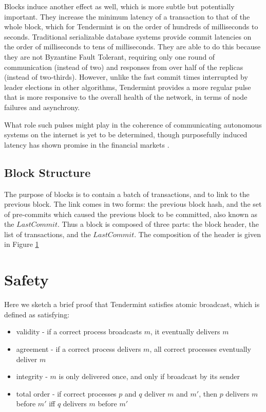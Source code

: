 Blocks induce another effect as well, which is more subtle but potentially important. 
They increase the minimum latency of a transaction to that of the whole block, 
which for Tendermint is on the order of hundreds of milliseconds to seconds.
Traditional serializable database systems provide commit latencies on the 
order of milliseconds to tens of milliseconds.
They are able to do this because they are not Byzantine Fault Tolerant, 
requiring only one round of communication (instead of two)
and responses from over half of the replicas (instead of two-thirds).
However, unlike the fast commit times interrupted by leader elections in other algorithms,
Tendermint provides a more regular pulse that is more responsive to the overall health of the network, 
in terms of node failures and asynchrony.

What role such pulses might play in the coherence of 
communicating autonomous systems on the internet is yet to be determined,
though purposefully induced latency has shown promise in the financial markets \cite{ryan2015beyond}.

\subsection{Block Structure}

The purpose of blocks is to contain a batch of transactions, and to link to the previous block.
The link comes in two forms: the previous block hash,
and the set of pre-commits which caused the previous block to be committed, also known as the $LastCommit$.
Thus a block is composed of three parts: the block header, the list of transactions, and the $LastCommit$.
The composition of the header is given in Figure \ref{fig:header}

\begin{figure}[]
	
	\label{fig:header}
\end{figure}

\section{Safety}

Here we sketch a brief proof that Tendermint satisfies atomic broadcast,
which is defined as satisfying:

\begin{itemize}
\item validity - if a correct process broadcasts $m$, it eventually delivers $m$
\item agreement - if a correct process delivers $m$, all correct processes eventually deliver $m$
\item integrity - $m$ is only delivered once, and only if broadcast by its sender
\item total order - if correct processes $p$ and $q$ deliver $m$ and $m'$, then $p$ delivers $m$ before $m'$ iff $q$ delivers $m$ before $m'$
\end{itemize}

